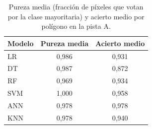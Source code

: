 \begin{table}[htbp]
 \centering
 \small
 \caption{Pureza media (fracción de píxeles que votan por la clase mayoritaria) y acierto medio por polígono en la pista A.}
 \label{tab:pureza}
 \begin{tabular}{lcc}
  \toprule
  Modelo & Pureza media & Acierto medio \\
  \midrule
  LR & 0{,}986 & 0{,}931 \\
  DT & 0{,}987 & 0{,}872 \\
  RF & 0{,}969 & 0{,}934 \\
  SVM & 1{,}000 & 0{,}958 \\
  ANN & 0{,}978 & 0{,}978 \\
  KNN & 0{,}978 & 0{,}940 \\
  \bottomrule
 \end{tabular}
\end{table}
